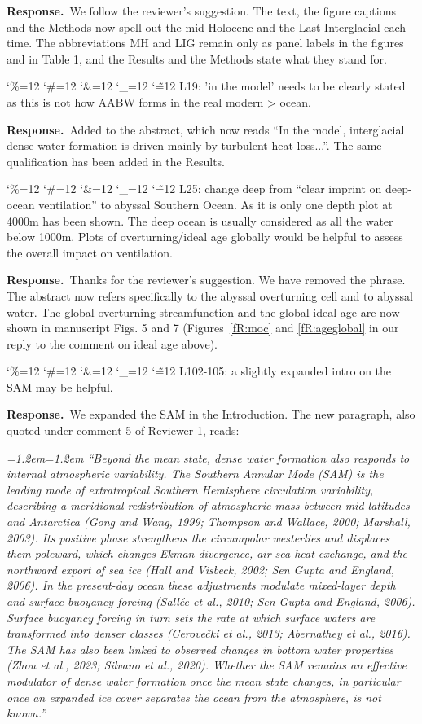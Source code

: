 \documentclass[11pt,a4paper]{article}
\newcommand{\comment}[1]{\par\medskip\noindent\color{black}\begingroup\catcode`\%=12 \catcode`\#=12 \catcode`\&=12 \catcode`\_=12 \catcode`\~=12 \commentbody}
\newcommand{\commentbody}[1]{#1\endgroup\par\smallskip}
\newcommand{\response}{\par\noindent\color{chgcol}\textbf{Response.}\ }
\newenvironment{change}{\par\smallskip\color{chgcol}\small\itshape\leftskip=1.2em\rightskip=1.2em\noindent\ignorespaces}{\par\smallskip}
\begin{document}
\response We follow the reviewer's suggestion. The text, the figure captions and the Methods now spell out the mid-Holocene and the Last Interglacial each time. The abbreviations MH and LIG remain only as panel labels in the figures and in Table 1, and the Results and the Methods state what they stand for.

\comment{R3}{L19: 'in the model' needs to be clearly stated as this is not how AABW forms in the real modern > ocean.}

\response Added to the abstract, which now reads ``In the model, interglacial dense water formation is driven mainly by turbulent heat loss...''. The same qualification has been added in the Results.

\comment{R3}{L25: change deep from “clear imprint on deep-ocean ventilation” to abyssal Southern Ocean. As it is only one depth plot at 4000m has been shown. The deep ocean is usually considered as all the water below 1000m. Plots of overturning/ideal age globally would be helpful to assess the overall impact on ventilation.}

\response Thanks for the reviewer’s suggestion. We have removed the phrase. The abstract now refers specifically to the abyssal overturning cell and to abyssal water. The global overturning streamfunction and the global ideal age are now shown in manuscript Figs. 5 and 7 (Figures~\ref{fR:moc} and \ref{fR:ageglobal} in our reply to the comment on ideal age above).

\comment{R3}{L102-105: a slightly expanded intro on the SAM may be helpful.}

\response We expanded the SAM in the Introduction. The new paragraph, also quoted under comment 5 of Reviewer 1, reads:

\begin{change}
``Beyond the mean state, dense water formation also responds to internal atmospheric variability. The Southern Annular Mode (SAM) is the leading mode of extratropical Southern Hemisphere circulation variability, describing a meridional redistribution of atmospheric mass between mid-latitudes and Antarctica (Gong and Wang, 1999; Thompson and Wallace, 2000; Marshall, 2003). Its positive phase strengthens the circumpolar westerlies and displaces them poleward, which changes Ekman divergence, air-sea heat exchange, and the northward export of sea ice (Hall and Visbeck, 2002; Sen Gupta and England, 2006). In the present-day ocean these adjustments modulate mixed-layer depth and surface buoyancy forcing (Sallée et al., 2010; Sen Gupta and England, 2006). Surface buoyancy forcing in turn sets the rate at which surface waters are transformed into denser classes (Cerovečki et al., 2013; Abernathey et al., 2016). The SAM has also been linked to observed changes in bottom water properties (Zhou et al., 2023; Silvano et al., 2020). Whether the SAM remains an effective modulator of dense water formation once the mean state changes, in particular once an expanded ice cover separates the ocean from the atmosphere, is not known.''
\end{change}
\end{document}
